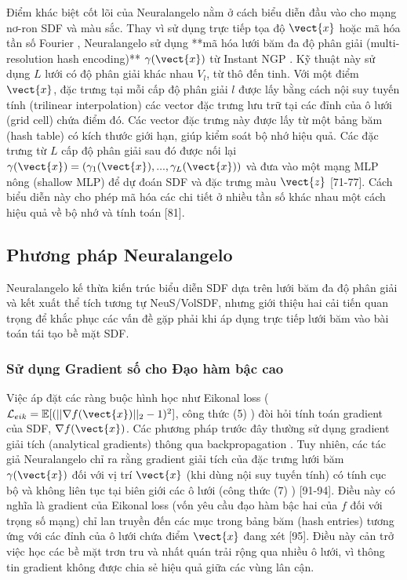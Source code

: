 Điểm khác biệt cốt lõi của Neuralangelo nằm ở cách biểu diễn đầu vào cho mạng nơ-ron SDF và màu sắc. Thay vì sử dụng trực tiếp tọa độ $\vect{x}$ hoặc mã hóa tần số Fourier \cite{Tancik20Fourier}, Neuralangelo sử dụng **mã hóa lưới băm đa độ phân giải (multi-resolution hash encoding)** $\gamma(\vect{x})$ từ Instant NGP \cite{Muller22InstantNGP}. Kỹ thuật này sử dụng $L$ lưới có độ phân giải khác nhau $V_l$, từ thô đến tinh. Với một điểm $\vect{x}$, đặc trưng tại mỗi cấp độ phân giải $l$ được lấy bằng cách nội suy tuyến tính (trilinear interpolation) các vector đặc trưng lưu trữ tại các đỉnh của ô lưới (grid cell) chứa điểm đó. Các vector đặc trưng này được lấy từ một bảng băm (hash table) có kích thước giới hạn, giúp kiểm soát bộ nhớ hiệu quả. Các đặc trưng từ $L$ cấp độ phân giải sau đó được nối lại $\gamma(\vect{x}) = (\gamma_1(\vect{x}), ..., \gamma_L(\vect{x}))$ và đưa vào một mạng MLP nông (shallow MLP) để dự đoán SDF và đặc trưng màu $\vect{z}$ [71-77]. Cách biểu diễn này cho phép mã hóa các chi tiết ở nhiều tần số khác nhau một cách hiệu quả về bộ nhớ và tính toán [81].

\subsection{Phương pháp Neuralangelo}
\label{subsec:neuralangelo_method}

Neuralangelo kế thừa kiến trúc biểu diễn SDF dựa trên lưới băm đa độ phân giải và kết xuất thể tích tương tự NeuS/VolSDF, nhưng giới thiệu hai cải tiến quan trọng để khắc phục các vấn đề gặp phải khi áp dụng trực tiếp lưới băm vào bài toán tái tạo bề mặt SDF.

\subsubsection{Sử dụng Gradient số cho Đạo hàm bậc cao}
\label{subsubsec:neuralangelo_numerical_grad}

Việc áp đặt các ràng buộc hình học như Eikonal loss ($\mathcal{L}_{eik} = \mathbb{E}[(||\nabla f(\vect{x})||_2 - 1)^2]$, công thức (5) \cite{Li23Neuralangelo}) đòi hỏi tính toán gradient của SDF, $\nabla f(\vect{x})$. Các phương pháp trước đây thường sử dụng gradient giải tích (analytical gradients) thông qua backpropagation \cite{Wang21NeuS, Yariv20IDR, Yariv21VolSDF, Yang21Geometry}. Tuy nhiên, các tác giả Neuralangelo chỉ ra rằng gradient giải tích của đặc trưng lưới băm $\gamma(\vect{x})$ đối với vị trí $\vect{x}$ (khi dùng nội suy tuyến tính) có tính cục bộ và không liên tục tại biên giới các ô lưới (công thức (7) \cite{Li23Neuralangelo}) [91-94]. Điều này có nghĩa là gradient của Eikonal loss (vốn yêu cầu đạo hàm bậc hai của $f$ đối với trọng số mạng) chỉ lan truyền đến các mục trong bảng băm (hash entries) tương ứng với các đỉnh của ô lưới chứa điểm $\vect{x}$ đang xét [95]. Điều này cản trở việc học các bề mặt trơn tru và nhất quán trải rộng qua nhiều ô lưới, vì thông tin gradient không được chia sẻ hiệu quả giữa các vùng lân cận.

